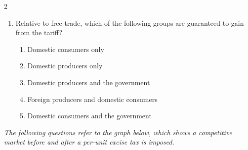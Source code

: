 \documentclass[10pt]{article}
\newenvironment{choiceslist}
  {\begin{enumerate}[label=(\Alph*), leftmargin=1.55em, itemsep=0.1em, topsep=0.15em, parsep=0pt]}
  {\end{enumerate}}
\newenvironment{stimulus}
  {\begin{center}\begin{minipage}{0.97\columnwidth}\footnotesize\itshape\setlength{\tabcolsep}{3pt}\renewcommand{\arraystretch}{0.96}}
  {\end{minipage}\end{center}}
\begin{document}
\begin{multicols*}{2}
\begin{enumerate}[resume*=curveq, leftmargin=*, itemsep=0.8em, topsep=0.18em, parsep=0pt]
\begin{choiceslist}
\end{choiceslist}
\item Relative to free trade, which of the following groups are guaranteed to gain from the tariff?
\begin{choiceslist}
\item Domestic consumers only
\item Domestic producers only
\item Domestic producers and the government
\item Foreign producers and domestic consumers
\item Domestic consumers and the government
\end{choiceslist}
\end{enumerate}
\begin{stimulus}
The following questions refer to the graph below, which shows a competitive market before and after a per-unit excise tax is imposed.


\end{stimulus}
\end{multicols*}
\end{document}
